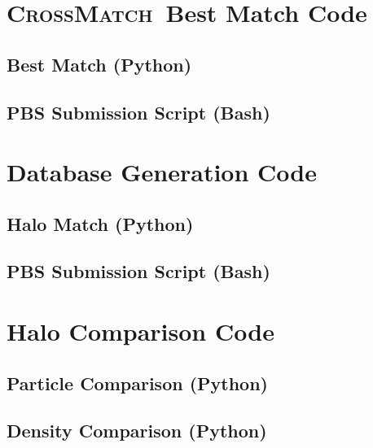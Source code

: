 \documentclass[12pt]{report}
\newcommand{\crossmatch}{\textsc{CrossMatch}}
\begin{document}
\begin{appendices}
	\chapter{\crossmatch\ Best Match Code}
	\label{app:best_match}
	\section{Best Match (Python)}
	\label{app:best_match}
	
	\section{PBS Submission Script (Bash)}
	\label{app:run_best_match}
	

	\chapter{Database Generation Code}
	\label{app:database_generation}
	\section{Halo Match (Python)}
	\label{app:match_halos}
	
	\section{PBS Submission Script (Bash)}
	\label{app:run_match}
	

	\chapter{Halo Comparison Code}
	\label{app:halo_comparison}
	\section{Particle Comparison (Python)}
	\label{app:particle_comparison}
	
	\section{Density Comparison (Python)}
	\label{app:density_comparison}
	


\end{appendices}
\end{document}
